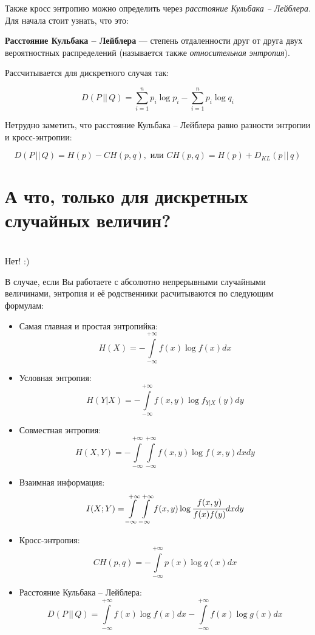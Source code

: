 Также кросс энтропию можно определить через \textit{расстояние Кульбака -- Лейблера}. Для начала стоит узнать, что это:

\begin{siderules}
    \textbf{Расстояние Кульбака -- Лейблера} --- степень отдаленности друг от друга двух вероятностных распределений (называется также \textit{относительная энтропия}). \end{siderules}
    
    Рассчитывается для дискретного случая так:

    \[D(P\, ||\, Q)=\sum\limits_{i=1}^n p_i\log p_i-\sum\limits_{i=1}^n p_i\log q_i\]

Нетрудно заметить, что расстояние Кульбака -- Лейблера равно разности энтропии и кросс-энтропии:

\[D(P\, ||\, Q)=H(p)-CH(p,q), \text{ или } CH(p, q)=H(p)+D_{KL}(p\, || \, q)\]

\section*{А что, только для дискретных случайных величин?}~\
\\

Нет! :)

В случае, если Вы работаете с абсолютно непрерывными случайными величинами, энтропия и её родственники расчитываются по следующим формулам:
\begin{itemize}
    \item Самая главная и простая энтропийка:
    \[H(X)=-\int\limits_{-\infty}^{+\infty} f(x)\log f(x)dx \]
    \item Условная энтропия:
    \[H(Y|X)=-\int\limits_{-\infty}^{+\infty} f(x, y)\log f_{Y|X}(y)dy \]
    \item Совместная энтропия:
    \[H(X, Y)=-\int\limits_{-\infty}^{+\infty} \int\limits_{-\infty}^{+\infty} f(x, y)\log f(x, y)dxdy \]
    \item Взаимная информация:
    \[I(X; Y)=\int\limits_{-\infty}^{+\infty} \int\limits_{-\infty}^{+\infty} f(x, y) \log \cfrac{f(x, y)}{f(x)f(y)}dxdy \]
    \item Кросс-энтропия:
    \[CH(p, q)=-\int\limits_{-\infty}^{+\infty}p(x)\log q(x) dx \]
    \item Расстояние Кульбака -- Лейблера:
    \[D(P\, ||\, Q)=\int\limits_{-\infty}^{+\infty} f(x)\log f(x)dx -\int\limits_{-\infty}^{+\infty} f(x)\log g(x)dx  \]
\end{itemize}

